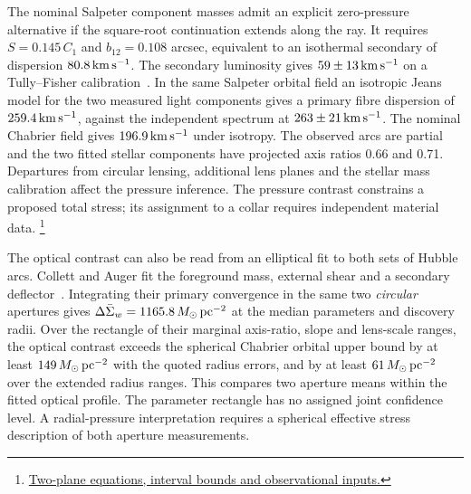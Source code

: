 \documentclass[11pt]{article}
\begin{document}
The nominal Salpeter component masses admit an explicit zero-pressure
alternative if the square-root continuation extends along the ray.
It requires $S=0.145\,C_1$ and $b_{12}=0.108$ arcsec, equivalent to
an isothermal secondary of dispersion $80.8\,{\rm km\,s^{-1}}$.
The secondary luminosity gives $59\pm13\,{\rm km\,s^{-1}}$ on a
Tully--Fisher calibration~\cite{jackpot2008}. In the same Salpeter
orbital field an isotropic Jeans model for the two measured light
components gives a primary fibre dispersion of $259.4\,{\rm km\,s^{-1}}$,
against the independent spectrum at $263\pm21\,{\rm km\,s^{-1}}$.
The nominal Chabrier field gives $196.9\,{\rm km\,s^{-1}}$ under
isotropy. The observed arcs are
partial and the two fitted stellar components have projected axis
ratios 0.66 and 0.71. Departures from circular lensing, additional
lens planes and the stellar mass calibration affect the pressure
inference. The pressure contrast constrains a proposed total stress;
its assignment to a collar requires independent material data.
\footnote{\href{https://github.com/FloatingPragma/observer-patch-holography/tree/main/code/cosmology/rar_deep_regime/double_ring_pressure}{Two-plane equations, interval bounds and observational inputs.}}

The optical contrast can also be read from an elliptical fit to both
sets of Hubble arcs. Collett and Auger fit the foreground mass, external
shear and a secondary deflector~\cite{jackpot2014}. Integrating their
primary convergence in the same two \emph{circular} apertures gives
$\Delta\bar\Sigma_w=1165.8\,M_\odot\,{\rm pc}^{-2}$ at the median
parameters and discovery radii. Over the rectangle of their marginal
axis-ratio, slope and lens-scale ranges, the optical contrast exceeds
the spherical Chabrier orbital upper bound by at least
$149\,M_\odot\,{\rm pc}^{-2}$ with the quoted radius errors, and by
at least $61\,M_\odot\,{\rm pc}^{-2}$ over the extended radius
ranges. This compares two aperture means within the fitted optical
profile. The parameter rectangle has no assigned joint confidence
level. A radial-pressure interpretation requires a spherical effective
stress description of both aperture measurements.
\end{document}
